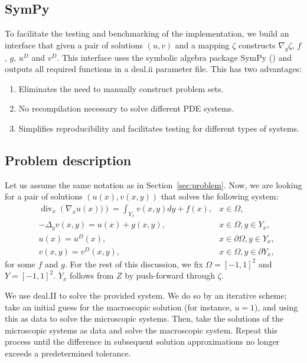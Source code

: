\documentclass{article}
\newcommand{\dealii}{deal.ii{}}
\renewcommand{\div}{\operatorname{div}}
\begin{document}
\subsection{SymPy}
To facilitate the testing and benchmarking of the implementation, we build an interface that given a pair of solutions $(u,v)$ and a mapping $\zeta$ constructs $\nabla_y \zeta$, $f$, $g$, $u^D$ and $v^D$.
This interface uses the symbolic algebra package SymPy (\cite{sympy}) and outputs all required functions in a \dealii{} parameter file. This has two advantages:
\begin{enumerate}
    \item Eliminates the need to manually construct problem sets.
    \item No recompilation necessary to solve different PDE systems.
    \item Simplifies reproducibility and facilitates testing for different types of systems.
\end{enumerate}

\subsection{Problem description}
\label{sub:problem_description}

Let us assume the same notation as in Section~\ref{sec:problem}.
Now, we are looking for a pair of solutions $(u(x),v(x,y))$ that solves the following system:
\begin{align}
    \label{eq:manu_macro}&\div_x\left( \nabla_x {u}(x))\right) = \int_{Y_x} v(x,y) dy + f(x),&x \in \Omega, \\
    \label{eq:manu_micro}&- \Delta_y v(x,y) = u(x) + g(x,y) ,&  x\in \Omega, y \in Y_x, \\
    \label{eq:manu_macro_bc}&{u}(x) = u^D(x), & x\in \partial \Omega,y \in Y_x,\\
    \label{eq:manu_micro_bc}&v(x,y) = v^D(x,y), & x\in \Omega,y \in \partial Y_x,
\end{align}
for some $f$ and $g$.
For the rest of this discussion, we fix $\Omega = [-1,1]^2$ and $Y = [-1,1]^2$.
$Y_x$ follows from $Z$ by push-forward through $\zeta$.

We use deal.II to solve the provided system. We do so by an iterative scheme; take an initial guess for the macroscopic solution (for instance, $u=1$), and using this as data to solve the microscopic systems.
Then, take the solutions of the microscopic systems as data and solve the macroscopic system.
Repeat this process until the difference in subsequent solution approximations no longer exceeds a predetermined tolerance.
\end{document}

